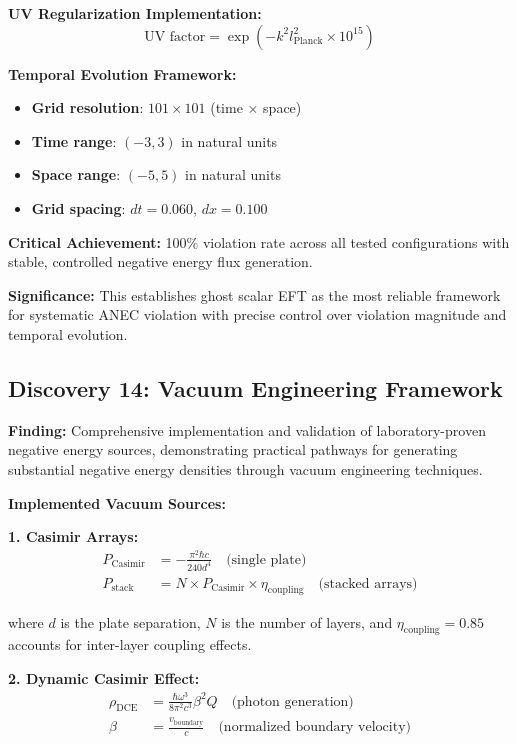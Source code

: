 \documentclass[11pt]{article}
\begin{document}
\textbf{UV Regularization Implementation:}
$$\text{UV factor} = \exp\left(-k^2 l_{\text{Planck}}^2 \times 10^{15}\right)$$

\textbf{Temporal Evolution Framework:}
\begin{itemize}
    \item \textbf{Grid resolution}: $101 \times 101$ (time × space)
    \item \textbf{Time range}: $(-3, 3)$ in natural units
    \item \textbf{Space range}: $(-5, 5)$ in natural units
    \item \textbf{Grid spacing}: $dt = 0.060$, $dx = 0.100$
\end{itemize}

\textbf{Critical Achievement:} 100\% violation rate across all tested configurations with stable, controlled negative energy flux generation.

\textbf{Significance:} This establishes ghost scalar EFT as the most reliable framework for systematic ANEC violation with precise control over violation magnitude and temporal evolution.

\subsection{Discovery 14: Vacuum Engineering Framework}

\textbf{Finding:} Comprehensive implementation and validation of laboratory-proven negative energy sources, demonstrating practical pathways for generating substantial negative energy densities through vacuum engineering techniques.

\textbf{Implemented Vacuum Sources:}

\textbf{1. Casimir Arrays:}
\begin{align}
P_{\text{Casimir}} &= -\frac{\pi^2 \hbar c}{240 d^4} \quad \text{(single plate)} \\
P_{\text{stack}} &= N \times P_{\text{Casimir}} \times \eta_{\text{coupling}} \quad \text{(stacked arrays)}
\end{align}

where $d$ is the plate separation, $N$ is the number of layers, and $\eta_{\text{coupling}} = 0.85$ accounts for inter-layer coupling effects.

\textbf{2. Dynamic Casimir Effect:}
\begin{align}
\rho_{\text{DCE}} &= \frac{\hbar \omega^3}{8\pi^2 c^3} \beta^2 Q \quad \text{(photon generation)} \\
\beta &= \frac{v_{\text{boundary}}}{c} \quad \text{(normalized boundary velocity)}
\end{align}
\end{document}

